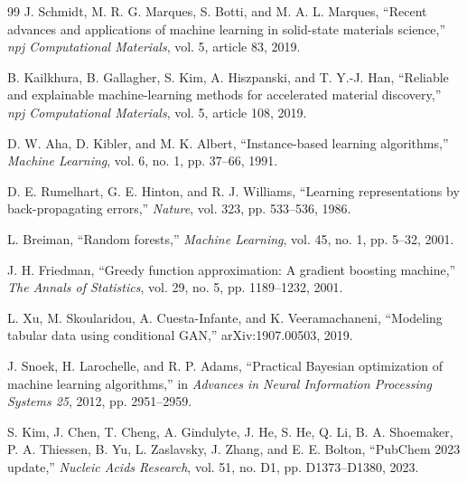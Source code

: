 \documentclass[11pt]{article}
\begin{document}
\begin{thebibliography}{99}
J. Schmidt, M. R. G. Marques, S. Botti, and M. A. L. Marques,
``Recent advances and applications of machine learning in solid-state materials science,''
\textit{npj Computational Materials}, vol. 5, article 83, 2019.

B. Kailkhura, B. Gallagher, S. Kim, A. Hiszpanski, and T. Y.-J. Han,
``Reliable and explainable machine-learning methods for accelerated material discovery,''
\textit{npj Computational Materials}, vol. 5, article 108, 2019.

D. W. Aha, D. Kibler, and M. K. Albert,
``Instance-based learning algorithms,''
\textit{Machine Learning}, vol. 6, no. 1, pp. 37--66, 1991.

D. E. Rumelhart, G. E. Hinton, and R. J. Williams,
``Learning representations by back-propagating errors,''
\textit{Nature}, vol. 323, pp. 533--536, 1986.

L. Breiman,
``Random forests,''
\textit{Machine Learning}, vol. 45, no. 1, pp. 5--32, 2001.

J. H. Friedman,
``Greedy function approximation: A gradient boosting machine,''
\textit{The Annals of Statistics}, vol. 29, no. 5, pp. 1189--1232, 2001.

L. Xu, M. Skoularidou, A. Cuesta-Infante, and K. Veeramachaneni,
``Modeling tabular data using conditional GAN,''
arXiv:1907.00503, 2019.

J. Snoek, H. Larochelle, and R. P. Adams,
``Practical Bayesian optimization of machine learning algorithms,''
in \textit{Advances in Neural Information Processing Systems 25}, 2012, pp. 2951--2959.

S. Kim, J. Chen, T. Cheng, A. Gindulyte, J. He, S. He, Q. Li, B. A. Shoemaker, P. A. Thiessen, B. Yu, L. Zaslavsky, J. Zhang, and E. E. Bolton,
``PubChem 2023 update,''
\textit{Nucleic Acids Research}, vol. 51, no. D1, pp. D1373--D1380, 2023.

\end{thebibliography}
\end{document}
